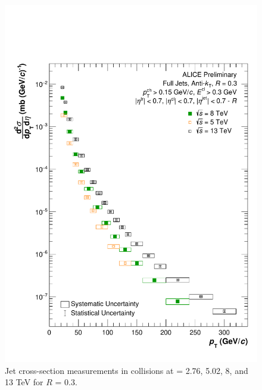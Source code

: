 \begin{figure}[h!]
    \centering
    \includegraphics[width=15cm]{figures/EnergyComparisons/SpectrumComparison_R03.pdf}
    \caption{Jet cross-section measurements in \pp collisions at \s = 2.76, 5.02, 8, and 13 TeV for $R$ = 0.3.}
    \label{fig:appSpecCompareR03}
\end{figure}

